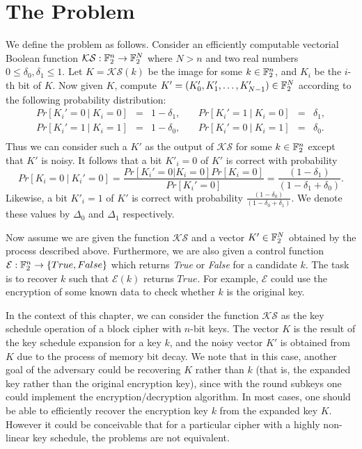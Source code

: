 \section{The \coldboot Problem}
\label{sec:coldboot}
We define the \coldboot problem as follows. Consider an efficiently computable vectorial Boolean function $\mathcal{KS}: \mathbb{F}_2^n \rightarrow \mathbb{F}_2^N$ where $N > n$ and two real numbers $0\leq \delta_0, \delta_1 \leq 1$. Let $K = \mathcal{KS}(k)$ be the image for some $k \in \mathbb{F}_2^n$, and $K_i$ be the $i$-th bit of $K$. Now given $K$, compute $K' = (K'_0, K'_1, \ldots, K'_{N-1}) \in \mathbb{F}_2^N$ according to the following probability distribution: 
$$
\begin{array}{lllllll}
Pr[K_i' = 0 \ | \ K_i = 0]  &=& 1 - \delta_1, & \ & Pr[K_i' = 1 \ | \ K_i = 0]  &=& \delta_1,\\
Pr[K_i' = 1 \ | \ K_i = 1]  &=& 1 - \delta_0, & \ & Pr[K_i' = 0 \ | \ K_i = 1]  &=& \delta_0.\\
\end{array}
$$
Thus we can consider such a $K'$ as the output of $\mathcal{KS}$ for some $k \in \mathbb{F}_2^n$ except that $K'$ is noisy. It follows that a bit $K'_i = 0$ of $K'$ is correct with probability
$$
Pr[K_i = 0 \ | \ K_i' = 0] = \frac{Pr[K_i'=0 | K_i=0]Pr[K_i=0]}{Pr[K_i'=0]} = \frac{(1 - \delta_1)}{(1 - \delta_1 + \delta_0)}.
$$
Likewise, a bit $K'_i = 1$ of $K'$ is correct with probability $\frac{(1 - \delta_0)}{(1 - \delta_0 + \delta_1)}$. We denote these values by $\Delta_0$ and $\Delta_1$ respectively.

Now assume we are given the function $\mathcal{KS}$ and a vector $K' \in \mathbb{F}_2^N$ obtained by the process described above.
Furthermore, we are also given a control function $\mathcal{E}: \mathbb{F}_2^n \rightarrow \{True,False\}$ which returns \emph{True} or \emph{False} for a candidate $k$.  The task is to recover $k$ such that $\mathcal{E}(k)$ returns $True$. For example, $\mathcal{E}$ could use the encryption of some known data to check whether $k$ is the original key.

In the context of this chapter, we can consider the function $\mathcal{KS}$ as the key schedule operation of a block cipher with $n$-bit keys. The vector $K$ is the result of the key schedule expansion for a key $k$, and the noisy vector $K'$ is obtained from $K$ due to the process of memory bit decay.
We note that in this case, another goal of the adversary could be recovering $K$ rather than $k$ (that is, the expanded key rather than the original encryption key), since with the round subkeys one could implement the encryption/decryption algorithm. In most cases, one should be able to efficiently recover the encryption key $k$ from the expanded key $K$. However it could be conceivable that for a particular cipher with a highly non-linear key schedule, the problems are not equivalent.
 
